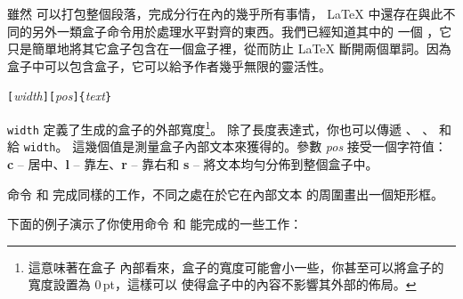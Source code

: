 雖然 可以打包整個段落，完成分行在內的幾乎所有事情，
\LaTeX{} 中還存在與此不同的另外一類盒子命令用於處理水平對齊的東西。我們已經知道其中的
一個 \pozhehao {}，它只是簡單地將其它盒子包含在一個盒子裡，從而防止
 \LaTeX{} 斷開兩個單詞。因為盒子中可以包含盒子，它可以給予作者幾乎無限的靈活性。

\begin{lscommand}
\verb|[|\emph{width}\verb|][|\emph{pos}\verb|]{|\emph{text}\verb|}|
\end{lscommand}

\noindent \texttt{width} 定義了生成的盒子的外部寬度\footnote{這意味著在盒子
內部看來，盒子的寬度可能會小一些，你甚至可以將盒子的寬度設置為 0\,pt，這樣可以
使得盒子中的內容不影響其外部的佈局。}。 除了長度表達式，你也可以傳遞
 、 、  和  給 \texttt{width}。
這幾個值是測量盒子內部文本來獲得的。參數 \emph{pos} 接受一個字符值：
\textbf{c} -- 居中、\textbf{l} -- 靠左、\textbf{r} -- 靠右和 \textbf{s} -- 
將文本均勻分佈到整個盒子中。

命令  和  完成同樣的工作，不同之處在於它在內部文本
的周圍畫出一個矩形框。

下面的例子演示了你使用命令  和  能完成的一些工作：

